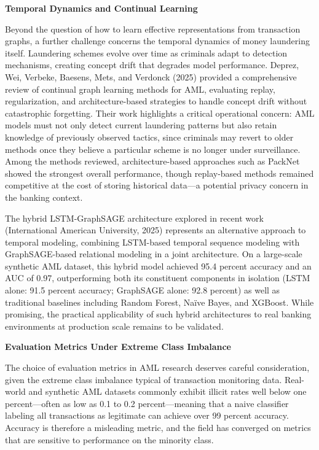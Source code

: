 \documentclass[12pt,a4paper]{article}
\begin{document}
\bigskip
\noindent\textbf{Temporal Dynamics and Continual Learning}

\noindent Beyond the question of how to learn effective representations from transaction graphs, a further challenge concerns the temporal dynamics of money laundering itself. Laundering schemes evolve over time as criminals adapt to detection mechanisms, creating concept drift that degrades model performance. Deprez, Wei, Verbeke, Baesens, Mets, and Verdonck (2025) provided a comprehensive review of continual graph learning methods for AML, evaluating replay, regularization, and architecture-based strategies to handle concept drift without catastrophic forgetting. Their work highlights a critical operational concern: AML models must not only detect current laundering patterns but also retain knowledge of previously observed tactics, since criminals may revert to older methods once they believe a particular scheme is no longer under surveillance. Among the methods reviewed, architecture-based approaches such as PackNet showed the strongest overall performance, though replay-based methods remained competitive at the cost of storing historical data---a potential privacy concern in the banking context.

The hybrid LSTM-GraphSAGE architecture explored in recent work (International American University, 2025) represents an alternative approach to temporal modeling, combining LSTM-based temporal sequence modeling with GraphSAGE-based relational modeling in a joint architecture. On a large-scale synthetic AML dataset, this hybrid model achieved 95.4 percent accuracy and an AUC of 0.97, outperforming both its constituent components in isolation (LSTM alone: 91.5 percent accuracy; GraphSAGE alone: 92.8 percent) as well as traditional baselines including Random Forest, Na\"ive Bayes, and XGBoost. While promising, the practical applicability of such hybrid architectures to real banking environments at production scale remains to be validated.

\bigskip
\noindent\textbf{Evaluation Metrics Under Extreme Class Imbalance}

\noindent The choice of evaluation metrics in AML research deserves careful consideration, given the extreme class imbalance typical of transaction monitoring data. Real-world and synthetic AML datasets commonly exhibit illicit rates well below one percent---often as low as 0.1 to 0.2 percent---meaning that a naive classifier labeling all transactions as legitimate can achieve over 99 percent accuracy. Accuracy is therefore a misleading metric, and the field has converged on metrics that are sensitive to performance on the minority class.
\end{document}
